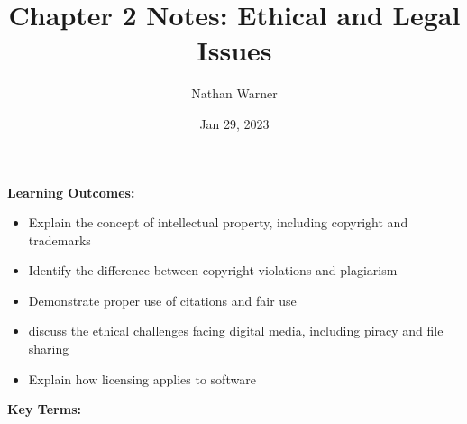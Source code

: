 \documentclass{report}
\title{\Huge{Chapter 2 Notes: Ethical and Legal Issues}}
\author{\huge{Nathan Warner}}
\date{\huge{Jan 29, 2023}}
\begin{document}
    \maketitle

    \begin{Large}
        \noindent \textbf{Learning Outcomes:}
    \end{Large}

    \bigbreak \noindent 
    \begin{itemize}
        \item Explain the concept of intellectual property, including copyright and trademarks
        \item Identify the difference between copyright violations and plagiarism
        \item Demonstrate proper use of citations and fair use
        \item discuss the ethical challenges facing digital media, including piracy and file sharing
        \item Explain how licensing applies to software
    \end{itemize}

    \bigbreak \noindent \bigbreak \noindent 
    \begin{Large}
        \textbf{Key Terms:}
    \end{Large}
\end{document}

